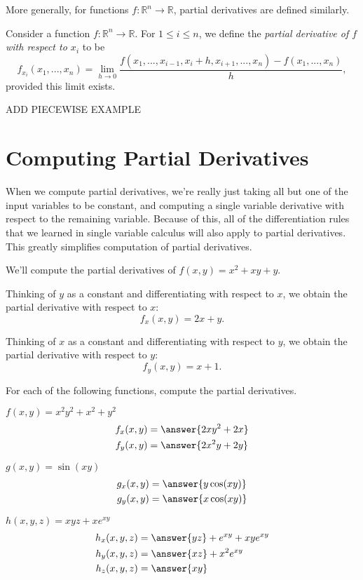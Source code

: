 \documentclass{ximera}
\begin{document}
More generally, for functions $f:\mathbb{R}^n\rightarrow \mathbb{R}$, partial derivatives are defined similarly.

\begin{definition}
Consider a function $f:\mathbb{R}^n\rightarrow\mathbb{R}$. For $1\leq i\leq n$, we define the \emph{partial derivative of $f$ with respect to $x_i$} to be
\[
f_{x_i}(x_1,...,x_n) = \lim_{h\rightarrow 0}\frac{f(x_1,...,x_{i-1}, x_i+h, x_{i+1},...,x_n)-f(x_1,...,x_n)}{h},
\]
provided this limit exists.
\end{definition}

ADD PIECEWISE EXAMPLE

\section*{Computing Partial Derivatives}

When we compute partial derivatives, we're really just taking all but one of the input variables to be constant, and computing a single variable derivative with respect to the remaining variable. Because of this, all of the differentiation rules that we learned in single variable calculus will also apply to partial derivatives. This greatly simplifies computation of partial derivatives.

\begin{example}
We'll compute the partial derivatives of $f(x,y) = x^2+xy+y$. 

Thinking of $y$ as a constant and differentiating with respect to $x$, we obtain the partial derivative with respect to $x$:
\[
f_x(x,y) = 2x+y.
\]

Thinking of $x$ as a constant and differentiating with respect to $y$, we obtain the partial derivative with respect to $y$:
\[
f_y(x,y) = x+1.
\]
\end{example}

\begin{example}
For each of the following functions, compute the partial derivatives.

$f(x,y) = x^2y^2 + x^2 + y^2$
\begin{align*}
f_x(x,y) &= \answer{2xy^2+2x}\\
f_y(x,y) &= \answer{2x^2y+2y}
\end{align*}

$g(x,y) = \sin(xy)$
\begin{align*}
g_x(x,y) &= \answer{y\cos(xy)}\\
g_y(x,y) &= \answer{x\cos(xy)}
\end{align*}

$h(x,y,z) = xyz + xe^{xy}$
\begin{align*}
h_x(x,y,z) &= \answer{yz} + e^{xy} + xye^{xy}\\
h_y(x,y,z) &= \answer{xz} + x^2e^{xy}\\
h_z(x,y,z) &= \answer{xy}
\end{align*}
\end{example}
\end{document}
